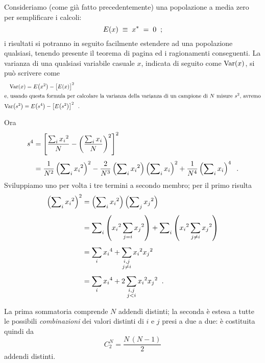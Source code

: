 Consideriamo (come gi\`a fatto precedentemente) una
popolazione a media zero per semplificare i calcoli:
\begin{equation*}
  E(x) \; \equiv \; x^* \; = \; 0 \;\; ;
\end{equation*}
i risultati si potranno in seguito facilmente estendere ad
una popolazione qualsiasi, tenendo presente il teorema di
pagina \pageref{def:5.varind} ed i ragionamenti conseguenti.
La varianza di una qualsiasi variabile casuale $x$, indicata
di seguito come $\operatorname{Var} (x)$, si pu\`o scrivere come
\begin{gather*}
  \operatorname{Var}( x ) = E \bigl( x^2 \bigr) -
    \bigl[ E( x ) \bigr]^2 \\
  \intertext{e, usando questa formula per calcolare la
    varianza della varianza di un campione di $N$
    misure $s^2$, avremo}
  \operatorname{Var} \bigl( s^2 \bigr) = E \bigl( s^4 \bigr)
    - \left[ E \bigl( s^2 \bigr) \right]^2 \;\; .
\end{gather*}

Ora
\begin{align*}
  s^4 &= \left[ \frac{\sum_i {x_i}^2}{N} -
    \left( \frac{\sum_i x_i}{N} \right) ^2 \right]^2
    \\[1ex]
  &= \frac{1}{N^2} \left( \sum \nolimits_i {x_i}^2
    \right) ^2 - \frac{2}{N^3} \left( \sum\nolimits_i
    {x_i}^2 \right) \left( \sum \nolimits_i x_i
    \right)^2 + \frac{1}{N^4} \left( \sum\nolimits_i
    x_i \right) ^4 \;\; .
\end{align*}
Sviluppiamo uno per volta i tre termini a secondo membro;
per il primo risulta
\begin{align*}
  \left( \sum \nolimits_i {x_i}^2 \right) ^2 &=
    \left( \sum \nolimits_i {x_i}^2 \right)
    \Bigl( \sum \nolimits_j {x_j}^2 \Bigr)
    \\[1ex]
  &= \sum \nolimits_i \left( {x_i}^2
    \sum_{j=i} {x_j}^2 \right) +
    \sum \nolimits_i \left( {x_i}^2
    \sum_{j \neq i} {x_j}^2 \right) \\[1ex]
  &= \sum_i {x_i}^4 +
    \sum_{\substack{i,j\\j \neq i}} {x_i}^2 {x_j}^2
    \\[1ex]
  &= \sum_i {x_i}^4 +
    2 \sum_{\substack{i,j\\ j < i}} {x_i}^2 {x_j}^2 \;\; .
\end{align*}

La prima sommatoria comprende $N$ addendi distinti; la
seconda \`e estesa a tutte le possibili \emph{combinazioni}
dei valori distinti di $i$ e $j$ presi a due a due: \`e
costituita quindi da
\begin{equation*}
  C^N_2 = \frac{N \, (N-1)}{2}
\end{equation*}
addendi distinti.

